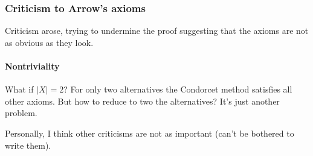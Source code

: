 \subsubsection{Criticism to Arrow's axioms}

Criticism arose, trying to undermine the proof suggesting that the axioms are not as obvious as they look.

\paragraph{Nontriviality} What if $|X| = 2$? For only two alternatives the Condorcet method satisfies all other axioms. But how to reduce to two the alternatives? It's just another problem.

Personally, I think other criticisms are not as important (can't be bothered to write them).

